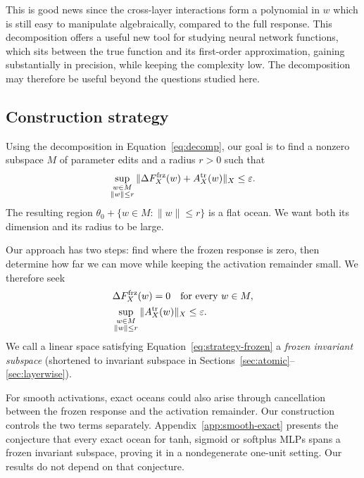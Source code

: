 \documentclass[twoside]{article}
\theoremstyle{remark}
\newcommand{\frz}{\mathrm{frz}}
\theoremstyle{highlightdefinition}
\theoremstyle{remark}
\begin{document}
This is good news since the cross-layer interactions form a polynomial in $w$ which is still easy to manipulate algebraically, compared to the full response. This decomposition offers a useful new tool for studying neural network functions, which sits between the true function and its first-order approximation, gaining substantially in precision, while keeping the complexity low. The decomposition may therefore be useful beyond the questions studied here.


\subsection{Construction strategy}
\label{sec:branches}

Using the decomposition in Equation~\ref{eq:decomp}, our goal is to find a nonzero subspace $M$ of parameter edits and a radius $r>0$ such that
\[
 \sup_{\substack{w\in M\\\|w\|\le r}}
 \|\Delta F_X^{\frz}(w)+A_X^{\rm tr}(w)\|_X\le\varepsilon.
\]
The resulting region $\theta_0+\{w\in M:\|w\|\le r\}$ is a flat ocean. We want both its dimension and its radius to be large.

Our approach has two steps: find where the frozen response is zero, then determine how far we can move while keeping the activation remainder small. We therefore seek
\begin{align}
 &\Delta F_X^{\frz}(w)=0\quad\text{for every }w\in M,
 \label{eq:strategy-frozen}\\
 &\sup_{\substack{w\in M\\\|w\|\le r}}\|A_X^{\rm tr}(w)\|_X\le\varepsilon.
 \label{eq:strategy-radius}
\end{align}
We call a linear space satisfying Equation~\ref{eq:strategy-frozen} a \emph{frozen invariant subspace} (shortened to invariant subspace in Sections~\ref{sec:atomic}--\ref{sec:layerwise}). 

For smooth activations, exact oceans could also arise through cancellation between the frozen response and the activation remainder. Our construction controls the two terms separately. Appendix~\ref{app:smooth-exact} presents the conjecture that every exact ocean for tanh, sigmoid or softplus MLPs spans a frozen invariant subspace, proving it in a nondegenerate one-unit setting. Our results do not depend on that conjecture.
\end{document}
